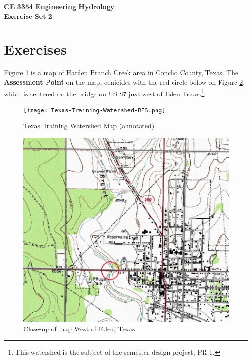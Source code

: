 \documentclass[12pt]{article}
\begin{document}
\begin{center}
{\textbf{{ CE 3354 Engineering Hydrology} \\ {Exercise Set 2}}}
\end{center}

\section*{\small{Exercises}}
Figure \ref{fig:Texas-Training-Watershed-RFS} is a map of Harden Branch Creek area in Concho County, Texas. 
The \textbf{Assessment Point} on the map, conicides with the red circle below on Figure \ref{fig:hardinbranch-RFS}, which is centered on the bridge on US 87 just west of Eden Texas.\footnote{This watershed is the subject of the semester design project, PR-1.}

\begin{figure}[h!] %
   \centering
   \texttt{[image: Texas-Training-Watershed-RFS.png]} 
   \caption{Texas Training Watershed Map (annotated)}
   \label{fig:Texas-Training-Watershed-RFS}
\end{figure}

\begin{figure}[h!] %
   \centering
   \includegraphics[width=6in]{hardinbranch-RFS.png} 
   \caption{Close-up of map West of Eden, Texas}
   \label{fig:hardinbranch-RFS}
\end{figure}
\end{document}
